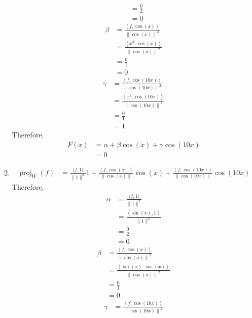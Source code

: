 \documentclass[fleqn, a4paper, 11pt, oneside]{amsart}
\theoremstyle{definition}
\theoremstyle{theorem}
\DeclareMathOperator{\proj}{proj}
\begin{document}
\begin{solution}
\begin{enumerate}
\begin{align*}
				&= \frac{0}{2}\\
				&= 0
			\end{align*}
			\begin{align*}
				\beta &= \frac{\left\langle f,\cos(x) \right\rangle}{\left\| \cos(x) \right\|^2}\\
				&= \frac{\left\langle x^3,\cos(x) \right\rangle}{\left\| \cos(x) \right\|^2}\\
				&= \frac{0}{1}\\
				&= 0
			\end{align*}
			\begin{align*}
				\gamma &= \frac{\left\langle f,\cos(10 x) \right\rangle}{\left\| \cos(10 x) \right\|^2}\\
				&= \frac{\left\langle x^3,\cos(10 x) \right\rangle}{\left\| \cos(10 x) \right\|^2}\\
				&= \frac{0}{1}\\
				&= 1
			\end{align*}
			Therefore,
			\begin{align*}
				F(x) &= \alpha + \beta \cos(x) + \gamma \cos(10 x)\\
				&= 0
			\end{align*}
		\item
			\begin{align*}
				\proj_{W}(f) &= \frac{\langle f,1 \rangle}{\|1\|^2} 1 + \frac{\left\langle f,\cos(x) \right\rangle}{\left\| \cos(x) \right\|} \cos(x) + \frac{\left\langle f,\cos(10 x) \right\rangle}{\left\| \cos(10 x) \right\|} \cos(10 x)
			\end{align*}
			Therefore,
			\begin{align*}
				\alpha &= \frac{\langle f,1 \rangle}{\|1\|^2}\\
				&= \frac{\left\langle \sin(x),1 \right\rangle}{\|1\|^2}\\
				&= \frac{0}{2}\\
				&= 0
			\end{align*}
			\begin{align*}
				\beta &= \frac{\left\langle f,\cos(x) \right\rangle}{\left\| \cos(x) \right\|^2}\\
				&= \frac{\left\langle \sin(x),\cos(x) \right\rangle}{\left\| \cos(x) \right\|^2}\\
				&= \frac{0}{1}\\
				&= 0
			\end{align*}
			\begin{align*}
				\gamma &= \frac{\left\langle f,\cos(10 x) \right\rangle}{\left\| \cos(10 x) \right\|^2}\\

\end{align*}
\end{enumerate}
\end{solution}
\end{document}
